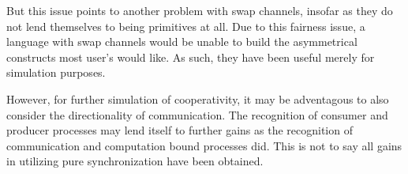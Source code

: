 But this issue points to another problem with swap channels, insofar as they do
not lend themselves to being primitives at all. Due to this fairness issue, a 
language with swap channels would be unable to build the asymmetrical constructs
most user's would like. As such, they have been useful merely for simulation 
purposes.

However, for further simulation of cooperativity, it may be adventagous to also 
consider the directionality of communication. The recognition of consumer and 
producer processes may lend itself to further gains as the recognition of 
communication and computation bound processes did. This is not to say all gains
in utilizing pure synchronization have been obtained. 
